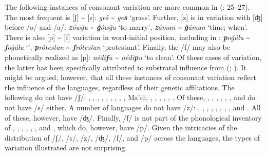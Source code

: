 \documentclass[output=paper]{langsci/langscibook}
\begin{document}
  The following instances of consonant variation are more common in   (\citealt{Manfredi2017}: 25–27). The most frequent is [ʃ] {\textasciitilde} [s]: \textit{geš} {\textasciitilde} \textit{ge\textbf{s}} ‘grass’. Further, [z] is in variation with [ʤ] before /o/ and /a/: \textit{\textbf{z}ówǧu} {\textasciitilde} \textit{\textbf{ǧ}ówǧu} ‘to marry’, \textit{\textbf{z}áman} {\textasciitilde} \textit{\textbf{ǧ}áman} ‘time; when’. There is also [p] {\textasciitilde} [f] variation in word-initial position, including in : \textit{\textbf{p}oǧúlu} {\textasciitilde} \textit{\textbf{f}oǧúlu} ‘’, \textit{\textbf{p}rótestan} {\textasciitilde} \textit{\textbf{f}rótestan} ‘protestant’. Finally, the  /f/ may also be phonetically realized as [p]: \textit{nédi\textbf{f}u} {\textasciitilde} \textit{nédi\textbf{p}u} ‘to clean’. Of these cases of variation, the latter has been specifically attributed to substratal influence from  (\citealt{Miller1989}; \citealt{Manfredi2017}). It might be argued, however, that all these instances of consonant variation reflect the influence of the  languages, regardless of their genetic affiliations. The following do not have /ʃ/: , , , , , , , , , Ma'di, , , , , , . Of these, , , , , , ,  and  do not have /s/ either. A number of  languages do not have /z/: , , , , , , , , and . All of these, however, have /ʤ/. Finally, /f/ is not part of the phonological inventory of , , , , , , and , which do, however, have /p/. Given the intricacies of the distribution of /ʃ/, /s/, /z/, /ʤ/, /f/, and /p/ across the  languages, the types of variation illustrated are not surprising. 
\end{document}
